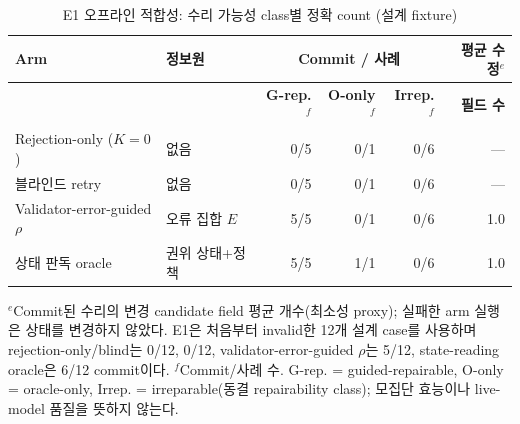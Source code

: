 \begin{table}[t]
\caption{E1 오프라인 적합성: 수리 가능성 class별 정확 count (설계 fixture)}
\label{tab:pilot-repair}
\centering\scriptsize
\setlength{\tabcolsep}{4pt}
\renewcommand{\arraystretch}{1.20}
\begin{tabularx}{\columnwidth}{@{}>{\raggedright\arraybackslash}X
 >{\raggedright\arraybackslash}X rrrr@{}}
\toprule
\textbf{Arm} & \textbf{정보원} & \multicolumn{3}{c}{\textbf{Commit / 사례}} & \textbf{평균 수정}$^{e}$ \\
\cmidrule(lr){3-5}
 & & \textbf{G-rep.}$^{f}$ & \textbf{O-only}$^{f}$ & \textbf{Irrep.}$^{f}$ & \textbf{필드 수} \\
\midrule
Rejection-only ($K{=}0$) & 없음 & 0/5 & 0/1 & 0/6 & --- \\
블라인드 retry & 없음 & 0/5 & 0/1 & 0/6 & --- \\
\addlinespace[2pt]
Validator-error-guided $\rho$ & 오류 집합 $E$ & 5/5 & 0/1 & 0/6 & 1.0 \\
상태 판독 oracle & 권위 상태+정책 & 5/5 & 1/1 & 0/6 & 1.0 \\
\bottomrule
\end{tabularx}
\par\vspace{3pt}\noindent\parbox{0.96\columnwidth}{\scriptsize $^{e}$Commit된 수리의 변경 candidate field 평균 개수(최소성 proxy); 실패한 arm 실행은 상태를 변경하지 않았다. E1은 처음부터 invalid한 12개 설계 case를 사용하며 rejection-only/blind는 0/12, 0/12, validator-error-guided $\rho$는 5/12, state-reading oracle은 6/12 commit이다. $^{f}$Commit/사례 수. G-rep. = guided-repairable, O-only = oracle-only, Irrep. = irreparable(동결 repairability class); 모집단 효능이나 live-model 품질을 뜻하지 않는다.}
\end{table}

